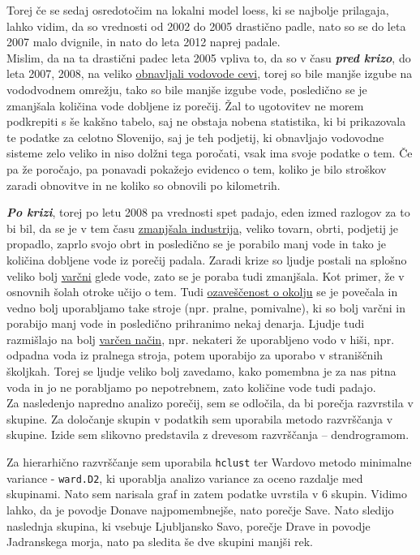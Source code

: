 \documentclass[11pt,a4paper]{article}
\begin{document}
Torej če se sedaj osredotočim na lokalni model loess, ki se najbolje prilagaja, lahko vidim, da so vrednosti od 2002 do 2005 drastično padle, nato so se do leta 2007 malo dvignile, in nato do leta 2012 naprej padale.\\
Mislim, da na ta drastični padec leta 2005 vpliva to, da so v času \textbf{\emph{pred krizo}}, do leta 2007, 2008, na veliko \underline{obnavljali vodovode cevi}, torej so bile manjše izgube na vododvodnem omrežju, tako so bile manjše izgube vode, posledično se je zmanjšala količina vode dobljene iz porečij. Žal to ugotovitev ne morem podkrepiti s še kakšno tabelo, saj ne obstaja nobena statistika, ki bi prikazovala te podatke za celotno Slovenijo, saj je teh podjetij, ki obnavljajo vodovodne sisteme zelo veliko in niso dolžni tega poročati, vsak ima svoje podatke o tem. Če pa že poročajo, pa ponavadi pokažejo evidenco o tem, koliko je bilo stroškov zaradi obnovitve in ne koliko so obnovili po kilometrih.

\textbf{\emph{Po krizi}}, torej po letu 2008 pa vrednosti spet padajo, eden izmed razlogov za to bi bil, da se je v tem času \underline{zmanjšala industrija}, veliko tovarn, obrti, podjetij je propadlo, zaprlo svojo obrt in  posledično se je porabilo manj vode in tako je količina dobljene vode iz porečij padala. Zaradi krize so ljudje postali na splošno veliko bolj \underline{varčni} glede vode, zato se je poraba tudi zmanjšala. Kot primer, že v osnovnih šolah otroke učijo o tem. Tudi \underline{ozaveščenost o okolju} se je povečala in vedno bolj uporabljamo take stroje (npr. pralne, pomivalne), ki so bolj varčni in porabijo manj vode in posledično prihranimo nekaj denarja. Ljudje tudi razmišlajo na bolj \underline{varčen način}, npr. nekateri že uporabljeno vodo v hiši, npr. odpadna voda iz pralnega stroja, potem uporabijo za uporabo v straniščnih školjkah. Torej se ljudje veliko bolj zavedamo, kako pomembna je za nas pitna voda in jo ne porabljamo po nepotrebnem, zato količine vode tudi padajo.\\


Za nasledenjo napredno analizo porečij, sem se odločila, da bi porečja razvrstila v skupine. Za določanje skupin v podatkih sem uporabila metodo razvrščanja v skupine. Izide sem slikovno predstavila z drevesom razvrščanja – dendrogramom.


Za hierarhično razvrščanje sem uporabila \verb|hclust| ter Wardovo metodo minimalne variance - \verb|ward.D2|, ki uporablja analizo variance za oceno razdalje med skupinami. Nato sem narisala graf in zatem podatke uvrstila v 6 skupin. Vidimo lahko, da je povodje Donave najpomembnejše, nato porečje Save. Nato sledijo naslednja skupina, ki vsebuje Ljubljansko Savo, porečje Drave in povodje Jadranskega morja, nato pa sledita še dve skupini manjši rek.
\end{document}
